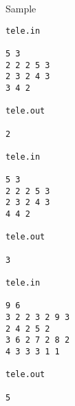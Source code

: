 Sample
\begin{verbatim}
tele.in 
 
5 3 
2 2 2 5 3 
2 3 2 4 3 
3 4 2 
 
tele.out 
 
2 

tele.in 
 
5 3 
2 2 2 5 3 
2 3 2 4 3 
4 4 2 
 
tele.out 
 
3 

tele.in 
 
9 6 
3 2 2 3 2 9 3 
2 4 2 5 2 
3 6 2 7 2 8 2 
4 3 3 3 1 1 
 
tele.out 
 
5
\end{verbatim}